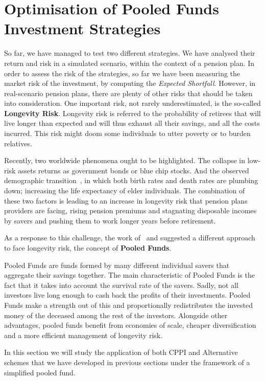 \section{Optimisation of Pooled Funds Investment Strategies}

So far, we have managed to test two different strategies. We have analysed their return and risk in a simulated scenario, within the context of a pension plan. In order to assess the risk of the strategies, so far we have been measuring the market risk of the investment, by computing the \emph{Expected Shortfall}. However, in real-scenario pension plans, there are plenty of other risks that should be taken into consideration. One important risk, not rarely underestimated, is the so-called \textbf{Longevity Risk}. Longevity risk is referred to the probability of retirees that will live longer than expected and will thus exhaust all their savings, and all the costs incurred. This risk might doom some individuals to utter poverty or to burden relatives.

Recently, two worldwide phenomena ought to be highlighted. The collapse in low-risk assets returns as government bonds or blue chip stocks. And the observed demographic transition~\textcite{b:demographic, a:bongaarts-human}, in which both birth rates and death rates are plumbing down; increasing the life expectancy of elder individuals. The combination of these two factors is leading to an increase in longevity risk that pension plans providers are facing, rising pension premiums and stagnating disposable incomes by savers and pushing them to work longer years before retirement.

As a response to this challenge, the work of~\cite{a:donnelly-transparency} and \cite{a:brautigam-pool} suggested a different approach to face longevity risk, the concept of \textbf{Pooled Funds}.

Pooled Funds are funds formed by many different individual savers that aggregate their savings together. The main characteristic of Pooled Funds is the fact that it takes into account the survival rate of the savers. Sadly, not all investors live long enough to cash back the profits of their investments. Pooled Funds make a strength out of this and proportionally redistributes the invested money of the deceased among the rest of the investors. Alongside other advantages, pooled funds benefit from economies of scale, cheaper diversification and a more efficient management of longevity risk.

In this section we will study the application of both CPPI and Alternative schemes that we have developed in previous sections under the framework of a simplified pooled fund.

